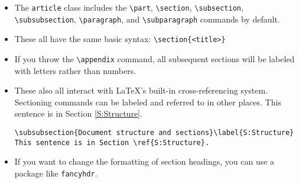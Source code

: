 \documentclass[11pt, letterpaper]{article}
\begin{document}
    \begin{itemize}
      \item The \verb+article+ class includes the \verb+\part+, \verb+\section+, \verb+\subsection+, \verb+\subsubsection+, \verb+\paragraph+, and \verb+\subparagraph+ commands by default.
      
      \item These all have the same basic syntax: \verb+\section{<title>}+
      
      
      \item If you throw the \verb+\appendix+ command, all subsequent sections will be labeled with letters rather than numbers.
      
      \item These also all interact with \LaTeX's built-in cross-referencing system. Sectioning commands can be labeled and referred to in other places. This sentence is in Section \ref{S:Structure}.

      
	\begin{exe}
	  \ex\verb+\subsubsection{Document structure and sections}\label{S:Structure}+
	  \ex\verb+This sentence is in Section \ref{S:Structure}.+
	\end{exe}

      
      \item If you want to change the formatting of section headings, you can use a package like \verb+fancyhdr+.
    \end{itemize}
\end{document}
